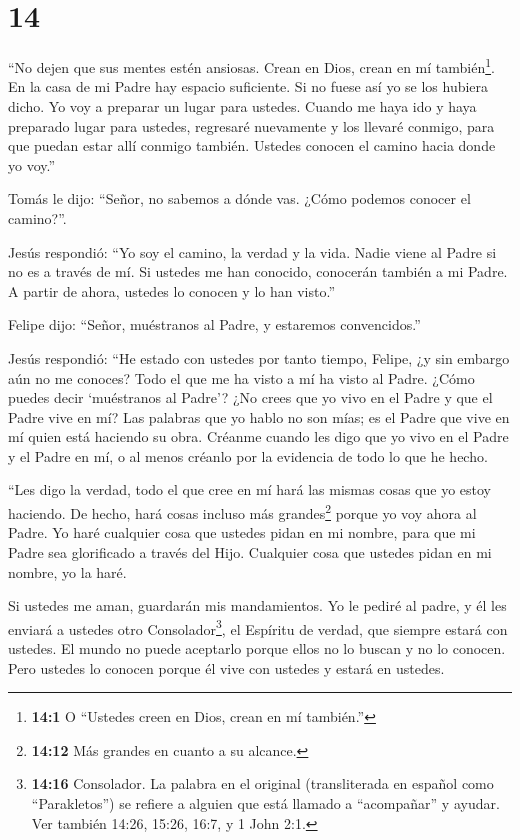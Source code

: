 \hypertarget{section-13}{%
\section{14}\label{section-13}}

 ``No dejen que sus mentes estén ansiosas. Crean en Dios,
crean en mí también\footnote{\textbf{14:1} O ``Ustedes creen en Dios,
  crean en mí también.''}.  En la casa de mi Padre hay
espacio suficiente. Si no fuese así yo se los hubiera dicho. Yo voy a
preparar un lugar para ustedes.  Cuando me haya ido y haya
preparado lugar para ustedes, regresaré nuevamente y los llevaré
conmigo, para que puedan estar allí conmigo también. 
Ustedes conocen el camino hacia donde yo voy.''

 Tomás le dijo: ``Señor, no sabemos a dónde vas. ¿Cómo
podemos conocer el camino?''.

 Jesús respondió: ``Yo soy el camino, la verdad y la vida.
Nadie viene al Padre si no es a través de mí.  Si ustedes me
han conocido, conocerán también a mi Padre. A partir de ahora, ustedes
lo conocen y lo han visto.''

 Felipe dijo: ``Señor, muéstranos al Padre, y estaremos
convencidos.''

 Jesús respondió: ``He estado con ustedes por tanto tiempo,
Felipe, ¿y sin embargo aún no me conoces? Todo el que me ha visto a mí
ha visto al Padre. ¿Cómo puedes decir `muéstranos al Padre'?
 ¿No crees que yo vivo en el Padre y que el Padre vive en
mí? Las palabras que yo hablo no son mías; es el Padre que vive en mí
quien está haciendo su obra.  Créanme cuando les digo que
yo vivo en el Padre y el Padre en mí, o al menos créanlo por la
evidencia de todo lo que he hecho.

 ``Les digo la verdad, todo el que cree en mí hará las
mismas cosas que yo estoy haciendo. De hecho, hará cosas incluso más
grandes\footnote{\textbf{14:12} Más grandes en cuanto a su alcance.}
porque yo voy ahora al Padre.  Yo haré cualquier cosa que
ustedes pidan en mi nombre, para que mi Padre sea glorificado a través
del Hijo.  Cualquier cosa que ustedes pidan en mi nombre,
yo la haré.

 Si ustedes me aman, guardarán mis mandamientos.
 Yo le pediré al padre, y él les enviará a ustedes otro
Consolador\footnote{\textbf{14:16} Consolador. La palabra en el original
  (transliterada en español como ``Parakletos'') se refiere a alguien
  que está llamado a ``acompañar'' y ayudar. Ver también 14:26, 15:26,
  16:7, y 1 John 2:1.},  el Espíritu de verdad, que siempre
estará con ustedes. El mundo no puede aceptarlo porque ellos no lo
buscan y no lo conocen. Pero ustedes lo conocen porque él vive con
ustedes y estará en ustedes.

